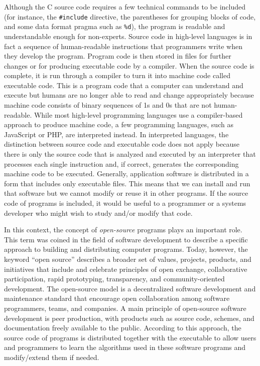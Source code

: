 Although the C source code requires a few technical commands to be included (for instance, the \texttt{\#include} directive, the parentheses for grouping blocks of code, and some data format pragma such as \texttt{\%d}), the program is readable and understandable enough for non-experts. Source code in high-level languages is in fact a sequence of human-readable instructions that programmers write when they develop the program. Program code is then stored in files for further changes or for producing executable code by a compiler. When the source code is complete, it is run through a compiler to turn it into machine code called executable code. This is a program code that a computer can understand and execute but humans are no longer able to read and change appropriately because machine code consists of binary sequences of 1s and 0s that are not human-readable. While most high-level programming languages use a compiler-based approach to produce machine code, a few programming languages, such as JavaScript or PHP, are interpreted instead. In interpreted languages, the distinction between source code and executable code does not apply because there is only the source code that is analyzed and executed by an interpreter that processes each single instruction and, if correct, generates the corresponding machine code to be executed. Generally, application software is distributed in a form that includes only executable files. This means that we can install and run that software but we cannot modify or reuse it in other programs. If the source code of programs is included, it would be useful to a programmer or a systems developer who might wish to study and/or modify that code.

In this context, the concept of \textit{open-source} programs plays an important role. This term was coined in the field of software development to describe a specific approach to building and distributing computer programs. Today, however, the keyword ``open source'' describes a broader set of values, projects, products, and initiatives that include and celebrate principles of open exchange, collaborative participation, rapid prototyping, transparency, and community-oriented development. The open-source model is a decentralized software development and \hbox{maintenance} standard that encourage open collaboration among software programmers, teams, and companies. A main principle of open-source software development is peer production, with products such as source code, schemes, and documentation freely available to the public. According to this approach, the source code of programs is distributed together with the executable to allow users and programmers to learn the algorithms used in these software programs and modify/{\allowbreak}extend them if needed.

